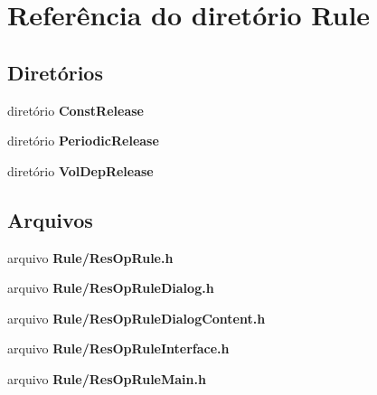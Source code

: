 \section{Referência do diretório Rule}
\label{dir_df2ee168b6473b352a4bd722cf93501c}
\subsection*{Diretórios}
\begin{DoxyCompactItemize}
\item 
diretório {\bf Const\+Release}
\item 
diretório {\bf Periodic\+Release}
\item 
diretório {\bf Vol\+Dep\+Release}
\end{DoxyCompactItemize}
\subsection*{Arquivos}
\begin{DoxyCompactItemize}
\item 
arquivo {\bf Rule/\+Res\+Op\+Rule.\+h}
\item 
arquivo {\bf Rule/\+Res\+Op\+Rule\+Dialog.\+h}
\item 
arquivo {\bf Rule/\+Res\+Op\+Rule\+Dialog\+Content.\+h}
\item 
arquivo {\bf Rule/\+Res\+Op\+Rule\+Interface.\+h}
\item 
arquivo {\bf Rule/\+Res\+Op\+Rule\+Main.\+h}
\end{DoxyCompactItemize}

